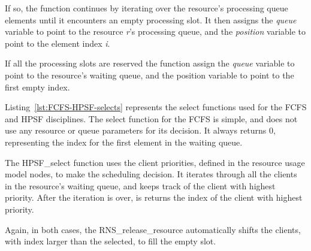 If so, the function continues by iterating over the resource's processing queue elements until it encounters an empty processing slot. It then assigns the \emph{queue} variable to point to the resource \emph{r}'s processing queue, and the \emph{position} variable to point to the element index \emph{i}.

If all the processing slots are reserved the function assign the \emph{queue} variable to point to the resource's waiting queue, and the position variable to point to the first empty index.



Listing~\ref{lst:FCFS-HPSF-selects} represents the select functions used for the FCFS and HPSF disciplines. The select function for the FCFS is simple, and does not use any resource or queue parameters for its decision. It always returns 0, representing the index for the first element in the waiting queue.

The HPSF\_select function uses the client priorities, defined in the resource usage model nodes, to make the scheduling decision. It iterates through all the clients in the resource's waiting queue, and keeps track of the client with highest priority. After the iteration is over, is returns the index of the client with highest priority.

Again, in both cases, the RNS\_release\_resource automatically shifts the clients, with index larger than the selected, to fill the empty slot.





